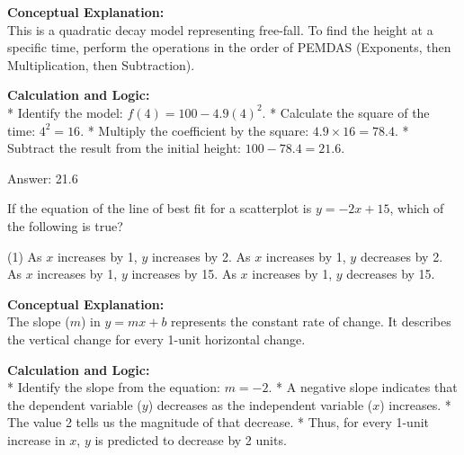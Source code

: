 \documentclass[11pt,paper=a4,answers]{exam}
\begin{document}
\begin{questions}
\begin{solution}
\textbf{Conceptual Explanation:} \\
This is a quadratic decay model representing free-fall. To find the height at a specific time, perform the operations in the order of PEMDAS (Exponents, then Multiplication, then Subtraction).

\vspace{30pt}

\textbf{Calculation and Logic:} \\
* Identify the model: $f(4) = 100 - 4.9(4)^2$.
* Calculate the square of the time: $4^2 = 16$.
* Multiply the coefficient by the square: $4.9 \times 16 = 78.4$.
* Subtract the result from the initial height: $100 - 78.4 = 21.6$.

\vspace{30pt}

Answer: \colorbox{yellow!100}{21.6}
\end{solution}

\vspace{60pt}

\question
If the equation of the line of best fit for a scatterplot is $y = -2x + 15$, which of the following is true?
\begin{tasks}(1)
    \task As $x$ increases by 1, $y$ increases by 2.
    \task As $x$ increases by 1, $y$ decreases by 2.
    \task As $x$ increases by 1, $y$ increases by 15.
    \task As $x$ increases by 1, $y$ decreases by 15.
\end{tasks}

\begin{solution}
\textbf{Conceptual Explanation:} \\
The slope ($m$) in $y = mx + b$ represents the constant rate of change. It describes the vertical change for every 1-unit horizontal change.

\vspace{30pt}

\textbf{Calculation and Logic:} \\
* Identify the slope from the equation: $m = -2$.
* A negative slope indicates that the dependent variable ($y$) decreases as the independent variable ($x$) increases.
* The value 2 tells us the magnitude of that decrease.
* Thus, for every 1-unit increase in $x$, $y$ is predicted to decrease by 2 units.

\vspace{30pt}


\end{solution}
\end{questions}
\end{document}
